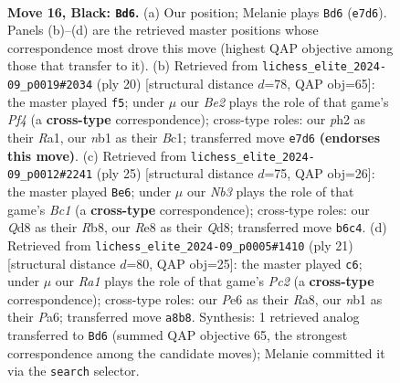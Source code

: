 \documentclass[11pt]{article}
\begin{document}
\clearpage

\begin{figure}[p]\centering
\begin{subfigure}{0.46\textwidth}\centering
\resizebox{\linewidth}{!}{%
\newchessgame
\chessboard[
  setfen={r1bqr1k1/pp2bppp/1n2p3/4n3/2Pp2P1/1P4KB/P2P1P1P/RNBQR3 b - - 1 16},
  showmover=false,
  pgfstyle=straightmove, color=movearrow, markmove={e7-d6}
]}
\caption{}
\end{subfigure}\hfill
\begin{subfigure}{0.46\textwidth}\centering
\resizebox{\linewidth}{!}{%
\newchessgame
\chessboard[
  setfen={2rqkbnr/1b1p1ppp/p3p3/np6/3NPP2/1BN5/PP4PP/R1BQ1RK1 w k - 1 11},
  showmover=false,
  pgfstyle=straightmove, color=movearrow, markmove={f4-f5}
]}
\caption{}
\end{subfigure}
\\[4pt]
\begin{subfigure}{0.46\textwidth}\centering
\resizebox{\linewidth}{!}{%
\newchessgame
\chessboard[
  setfen={1rbq1rk1/2p1bppp/p7/P2nR3/1p6/1BP5/1P1P1PPP/RNBQ2K1 b - - 0 13},
  showmover=false,
  pgfstyle=straightmove, color=movearrow, markmove={c8-e6}
]}
\caption{}
\end{subfigure}\hfill
\begin{subfigure}{0.46\textwidth}\centering
\resizebox{\linewidth}{!}{%
\newchessgame
\chessboard[
  setfen={r1bq1rk1/2p1bppp/p7/1p1nR3/8/1BP5/PP1P1PPP/RNBQ2K1 b - - 0 11},
  showmover=false,
  pgfstyle=straightmove, color=movearrow, markmove={c7-c6}
]}
\caption{}
\end{subfigure}
\caption{\textbf{Move 16, Black: \texttt{Bd6}.} (a) Our position; Melanie plays \texttt{Bd6} (\texttt{e7d6}). Panels (b)--(d) are the retrieved master positions whose correspondence most drove this move (highest QAP objective among those that transfer to it). (b) Retrieved from \texttt{lichess\_elite\_2024-09\_p0019\#2034} (ply 20) [structural distance $d$=78, QAP obj=65]: the master played \texttt{f5}; under $\mu$ our \emph{Be2} plays the role of that game's \emph{Pf4} (a \textbf{cross-type} correspondence); cross-type roles: our \emph{p}h2 as their \emph{R}a1, our \emph{n}b1 as their \emph{B}c1; transferred move \texttt{e7d6} \textbf{(endorses this move)}. (c) Retrieved from \texttt{lichess\_elite\_2024-09\_p0012\#2241} (ply 25) [structural distance $d$=75, QAP obj=26]: the master played \texttt{Be6}; under $\mu$ our \emph{Nb3} plays the role of that game's \emph{Bc1} (a \textbf{cross-type} correspondence); cross-type roles: our \emph{Q}d8 as their \emph{R}b8, our \emph{R}e8 as their \emph{Q}d8; transferred move \texttt{b6c4}. (d) Retrieved from \texttt{lichess\_elite\_2024-09\_p0005\#1410} (ply 21) [structural distance $d$=80, QAP obj=25]: the master played \texttt{c6}; under $\mu$ our \emph{Ra1} plays the role of that game's \emph{Pc2} (a \textbf{cross-type} correspondence); cross-type roles: our \emph{P}e6 as their \emph{R}a8, our \emph{n}b1 as their \emph{P}a6; transferred move \texttt{a8b8}. Synthesis: 1 retrieved analog transferred to \texttt{Bd6} (summed QAP objective 65, the strongest correspondence among the candidate moves); Melanie committed it via the \texttt{search} selector.}
\label{fig:thought-m31}
\end{figure}
\end{document}
